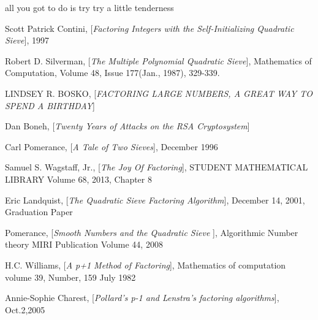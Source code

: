 \documentclass[12pt]{article} %
\begin{document}
	all you got to do is try try a little tenderness
	
	\pagebreak
	
	\begin{thebibliography}{99}
		
		 Scott Patrick Contini, [\textit{Factoring Integers with the Self-Initializing Quadratic Sieve}], 1997
		
		 Robert D. Silverman, [\textit{The Multiple Polynomial Quadratic Sieve}], Mathematics of Computation, Volume 48, Issue 177(Jan., 1987), 329-339.
		
		 LINDSEY R. BOSKO, [\textit{FACTORING LARGE NUMBERS, A GREAT WAY TO SPEND A BIRTHDAY}]
		
		 Dan Boneh, [\textit{Twenty Years of Attacks on the RSA Cryptosystem}]
		
		 Carl Pomerance, [\textit{A Tale of Two Sieves}], December 1996
		
		 Samuel S. Wagstaff, Jr., [\textit{The Joy Of Factoring}], STUDENT MATHEMATICAL LIBRARY Volume 68, 2013, Chapter 8
		
		 Eric Landquist, [\textit{The Quadratic Sieve Factoring Algorithm}], December 14, 2001, Graduation Paper
		
		 Pomerance, [\textit{Smooth Numbers and the Quadratic Sieve }], Algorithmic Number theory MIRI Publication Volume 44, 2008
		
		 H.C. Williams, [\textit{A p+1 Method of Factoring}], Mathematics of computation volume 39, Number, 159 July 1982
		
		 Annie-Sophie Charest, [\textit{Pollard's p-1 and Lenstra's factoring algorithms}], Oct.2,2005
		
	\end{thebibliography}
	
	
\end{document}

